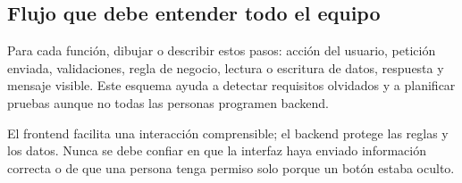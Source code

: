 \subsection{Flujo que debe entender todo el equipo}
Para cada función, dibujar o describir estos pasos: acción del usuario, petición enviada, validaciones, regla de negocio, lectura o escritura de datos, respuesta y mensaje visible. Este esquema ayuda a detectar requisitos olvidados y a planificar pruebas aunque no todas las personas programen backend.

\begin{infobox}[title={Idea clave}]
El frontend facilita una interacción comprensible; el backend protege las reglas y los datos. Nunca se debe confiar en que la interfaz haya enviado información correcta o de que una persona tenga permiso solo porque un botón estaba oculto.
\end{infobox}